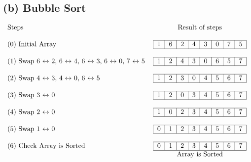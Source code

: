 \documentclass{article}
\begin{document}
\subsection*{(b) Bubble Sort}
\begin{align}
    \begin{tabular}{l c}
        \text{Steps} & \text{Result of steps}\\&\\
        \text{(0) Initial Array\;\;\;\;\;\;\;\;}&\begin{tabular}{|c|c|c|c|c|c|c|c|c|}
            \hline
        1&6&2&4&3&0&7&5\\
            \hline
        \end{tabular}\\&\\
        \text{(1) Swap 6 $\leftrightarrow$ 2, 6 $\leftrightarrow$ 4, 6 $\leftrightarrow$ 3, 6 $\leftrightarrow$ 0, 7 $\leftrightarrow$ 5}&\begin{tabular}{|c|c|c|c|c|c|c|c|c|}
            \hline
        1&2&4&3&0&6&5&7\\
            \hline
        \end{tabular}\\&\\
        \text{(2) Swap 4 $\leftrightarrow$ 3, 4 $\leftrightarrow$ 0, 6 $\leftrightarrow$ 5}&\begin{tabular}{|c|c|c|c|c|c|c|c|c|}
            \hline
        1&2&3&0&4&5&6&7\\
            \hline
        \end{tabular}\\&\\
        \text{(3) Swap 3 $\leftrightarrow$ 0 }&\begin{tabular}{|c|c|c|c|c|c|c|c|c|}
            \hline
        1&2&0&3&4&5&6&7\\
            \hline
        \end{tabular}\\&\\
        \text{(4) Swap 2 $\leftrightarrow$ 0 }&\begin{tabular}{|c|c|c|c|c|c|c|c|c|}
            \hline
        1&0&2&3&4&5&6&7\\
            \hline
        \end{tabular}\\&\\
        \text{(5) Swap 1 $\leftrightarrow$ 0 }&\begin{tabular}{|c|c|c|c|c|c|c|c|c|}
            \hline
        0&1&2&3&4&5&6&7\\
            \hline
        \end{tabular}\\&\\
        \text{(6) Check Array is Sorted }&\begin{tabular}{|c|c|c|c|c|c|c|c|c|}
            \hline
        0&1&2&3&4&5&6&7\\
            \hline
        \end{tabular}\\
        &\text{Array is Sorted}
    \end{tabular}
\end{align}
\end{document}
